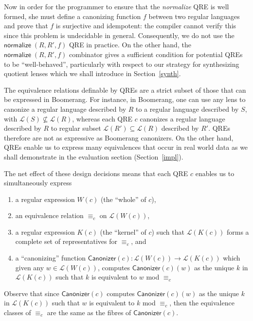 \documentclass[acmsmall,review,anonymous]{acmart}\settopmatter{printfolios=true,printccs=false,printacmref=false}
\newcommand{\kw}[1]{\ensuremath{\mathsf{#1}}}
\newcommand{\normalize}[3]{\ensuremath{\kw{normalize} \; (#1, #2, #3)}}
\newcommand{\canonizer}{\ensuremath{\kw{Canonizer}}}
\newcommand{\eqrel}[1]{\ensuremath{\equiv_{#1}}}
\begin{document}
Now in order for the programmer to ensure that the {\em normalize} QRE is well
formed, she must define a canonizing function $f$ between two regular
languages and prove that $f$ is surjective and idempotent: the compiler cannot
verify this since this problem is undecidable in general. Consequently, we do
not use the $\normalize{R}{R'}{f}$ QRE in practice. On the other hand, the
$\normalize{R}{R'}{f}$ combinator gives a sufficient condition for potential
QREs to be ``well-behaved'', particularly with respect to our strategy for
synthesizing quotient lenses which we shall introduce in Section~\ref{synth}.

The equivalence relations definable by QREs are a strict subset of those that
can be expressed in Boomerang. For instance, in Boomerang, one can use any lens
to canonize a regular language described by $R$ to a regular language described
by $S$, with $\mathcal{L}(S) \not \subseteq \mathcal{L}(R)$, whereas each QRE
$c$ canonizes a regular language described by $R$ to regular subset
$\mathcal{L}(R') \subseteq \mathcal{L}(R)$ described by $R'$. QREs therefore are
not as expressive as Boomerang canonizers. On the other hand, QREs enable us to
express many equivalences that occur in real world data as we shall demonstrate
in the evaluation section (Section~\ref{impl}).

The net effect of these design decisions means that each QRE $c$ enables
us to simultaneously express
\begin{enumerate}
  \item a regular expression $W(c)$ (the ``whole'' of $c$),
  \item an equivalence relation $\eqrel{c}$ on $\mathcal{L}(W(c))$,
  \item a regular expression $K(c)$ (the ``kernel'' of $c$)
  such that $\mathcal{L}(K(c))$ forms a complete set of representatives for
  $\eqrel{c}$, and
  \item a ``canonizing'' function $\canonizer(c):\mathcal{L}(W(c))
  \longrightarrow \mathcal{L}(K(c))$ which given any $w \in \mathcal{L}(W(c))$,
  computes $\canonizer(c)(w)$ as the unique $k$ in $\mathcal{L}(K(c))$ such that
  $k$ is equivalent to $w$ mod $\eqrel{c}$
\end{enumerate}
Observe that since $\canonizer(c)$ computes $\canonizer(c)(w)$ as the unique
$k$ in $\mathcal{L}(K(c))$ such that $w$ is equivalent to $k$ mod $\eqrel{c}$,
then the equivalence classes of $\eqrel{c}$ are the same as the fibres of
$\canonizer(c)$.
\end{document}
